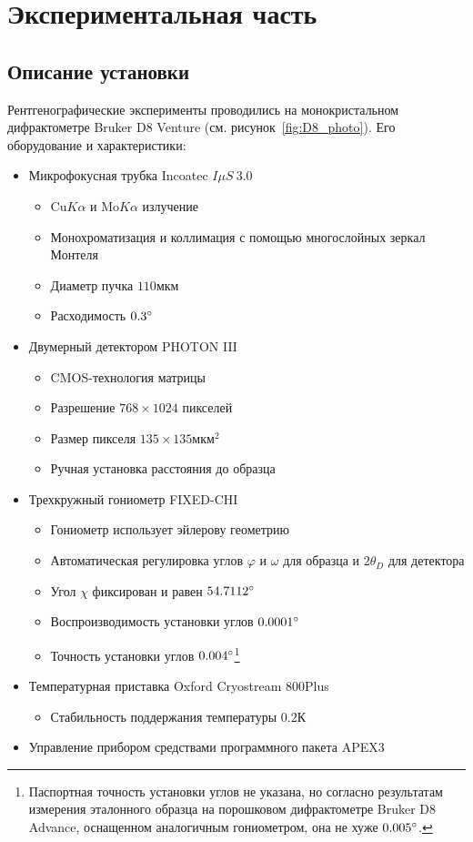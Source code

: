 \section{Экспериментальная часть}
\subsection{Описание установки}
Рентгенографические эксперименты проводились на монокристальном дифрактометре Bruker D8 Venture (см. рисунок~\ref{fig:D8_photo}).
Его оборудование и характеристики:
\begin{itemize}
    \item Микрофокусная трубка Incoatec $I \mu S \ 3.0$
    \begin{itemize}
        \item $\text{Cu} K\alpha$ и $\text{Mo} K\alpha$ излучение
        \item Монохроматизация и коллимация с помощью многослойных зеркал Монтеля
        \item Диаметр пучка $110\unit{мкм}$
        \item Расходимость $0.3^\circ$
    \end{itemize}
    \item Двумерный детектором PHOTON III
    \begin{itemize}
        \item CMOS-технология матрицы
        \item Разрешение $768 \times 1024$ пикселей
        \item Размер пикселя $135 \times 135\unit{мкм}^2$
        \item Ручная установка расстояния до образца
    \end{itemize}
    \item Трехкружный гониометр FIXED-CHI
    \begin{itemize}
        \item Гониометр использует эйлерову геометрию
        \item Автоматическая регулировка углов $\varphi$ и $\omega$ для образца и $2\theta_D$ для детектора
        \item Угол $\chi$ фиксирован и равен $54.7112^\circ$
        \item Воспроизводимость установки углов $0.0001^\circ$
        \item Точность установки углов $0.004^\circ$\footnote{Паспортная точность установки углов не указана, но согласно результатам измерения эталонного образца на порошковом дифрактометре Bruker D8 Advance, оснащенном аналогичным гониометром, она не хуже $0.005^\circ$.}
    \end{itemize}
    \item Температурная приставка Oxford Cryostream 800Plus
    \begin{itemize}
            \item Стабильность поддержания температуры $0.2\unit{К}$
    \end{itemize}
    \item Управление прибором средствами программного пакета APEX3~\cite{Bruker:2019}
\end{itemize}

